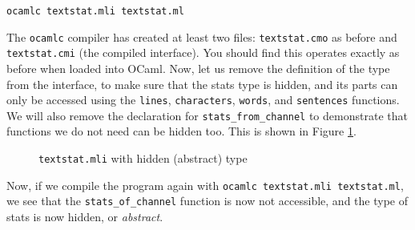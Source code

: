 \documentclass[]{book}
\newcommand{\smspace}{\vspace{4mm}}
\begin{document}
\smspace
\texttt{ocamlc textstat.mli textstat.ml}
\smspace

\noindent The \texttt{ocamlc} compiler has created at least two files:\! \texttt{textstat.cmo} as before and \texttt{textstat.cmi} (the compiled interface). You should find this operates exactly as before when loaded into OCaml. Now, let us remove the definition of the type from the interface, to make sure that the stats type is hidden, and its parts can only be accessed using the \texttt{lines}, \texttt{characters}, \texttt{words}, and \texttt{sentences} functions. We will also remove the declaration for \texttt{stats\_from\_channel} to demonstrate that functions we do not need can be hidden too. This is shown in Figure \ref{textstat2.mli}.

\begin{figure}
\begin{center}
\end{center}
\caption{\small\texttt{textstat.mli} with hidden (abstract) type}
\label{textstat2.mli}
\end{figure}

Now, if we compile the program again with \texttt{ocamlc\! textstat.mli\! textstat.ml}, we see that the \texttt{stats\_of\_channel} function is now not accessible, and the type of stats is now hidden, or \textit{abstract}.
\end{document}
